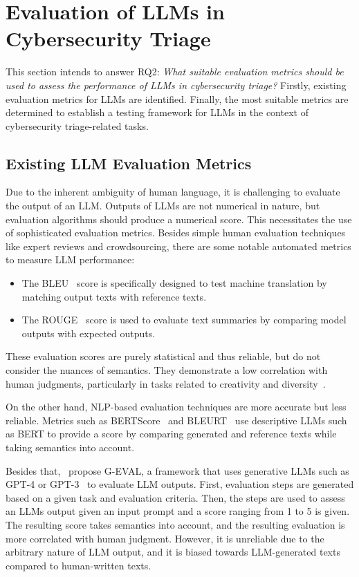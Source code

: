 \section{Evaluation of LLMs in Cybersecurity Triage}
\label{sec:rq2}

This section intends to answer RQ2:
\textit{What suitable evaluation metrics should be used to assess the performance of LLMs in cybersecurity triage?}
Firstly, existing evaluation metrics for LLMs are identified.
Finally, the most suitable metrics are determined to establish a testing framework for LLMs in the context of
cybersecurity triage-related tasks.

\subsection{Existing LLM Evaluation Metrics}
\label{subsec:rq2-existing-metrics}

Due to the inherent ambiguity of human language, it is challenging to evaluate the output of an LLM\@.
Outputs of LLMs are not numerical in nature, but evaluation algorithms should produce a numerical score.
This necessitates the use of sophisticated evaluation metrics.
Besides simple human evaluation techniques like expert reviews and crowdsourcing, there are some notable automated
metrics to measure LLM performance:
\begin{itemize}
    \item The BLEU\ \citep{papineni2002bleu} score is specifically designed to test machine translation by matching
    output texts with reference texts.
    \item The ROUGE\ \citep{lin2004rouge} score is used to evaluate text summaries by comparing model outputs with
    expected outputs.
\end{itemize}
These evaluation scores are purely statistical and thus reliable, but do not consider the nuances of semantics.
They demonstrate a low correlation with human judgments, particularly in tasks related to creativity and
diversity\ \citep{liu2023gpteval}.

On the other hand, NLP-based evaluation techniques are more accurate but less reliable.
Metrics such as BERTScore\ \citep{zhang2019bertscore} and BLEURT\ \citep{sellam2020bleurt} use descriptive LLMs such as
BERT to provide a score by comparing generated and reference texts while taking semantics into account.

Besides that,\ \citet{liu2023gpteval} propose G-EVAL, a framework that uses generative LLMs such as GPT-4 or
GPT-3\ \citep{brown2020language} to evaluate LLM outputs.
First, evaluation steps are generated based on a given task and evaluation criteria.
Then, the steps are used to assess an LLMs output given an input prompt and a score ranging from 1 to 5 is given.
The resulting score takes semantics into account, and the resulting evaluation is more correlated with human judgment.
However, it is unreliable due to the arbitrary nature of LLM output, and it is biased towards LLM-generated texts
compared to human-written texts.

